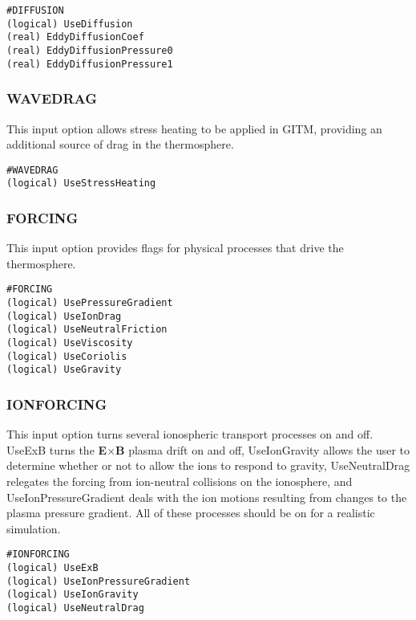\begin{verbatim}
#DIFFUSION
(logical) UseDiffusion
(real) EddyDiffusionCoef
(real) EddyDiffusionPressure0 
(real) EddyDiffusionPressure1
\end{verbatim}

\subsubsection{WAVEDRAG}
\label{wavedrag.sec}

This input option allows stress heating to be applied in GITM, providing an additional source of drag in the thermosphere.

\begin{verbatim}
#WAVEDRAG
(logical) UseStressHeating
\end{verbatim}

\subsubsection{FORCING}
\label{forcing.sec}

This input option provides flags for physical processes that drive the thermosphere.

\begin{verbatim}
#FORCING
(logical) UsePressureGradient 
(logical) UseIonDrag          
(logical) UseNeutralFriction  
(logical) UseViscosity        
(logical) UseCoriolis         
(logical) UseGravity        
\end{verbatim}

\subsubsection{IONFORCING}
\label{ionforcing.sec}

This input option turns several ionospheric transport processes on and off.  UseExB turns the {\bf E}$\times${\bf B} plasma drift on and off, UseIonGravity allows the user to determine whether or not to allow the ions to respond to gravity, UseNeutralDrag relegates the forcing from ion-neutral collisions on the ionosphere, and UseIonPressureGradient deals with the ion motions resulting from changes to the plasma pressure gradient.  All of these processes should be on for a realistic simulation.

\begin{verbatim}
#IONFORCING
(logical) UseExB           
(logical) UseIonPressureGradient
(logical) UseIonGravity     
(logical) UseNeutralDrag   
\end{verbatim}

